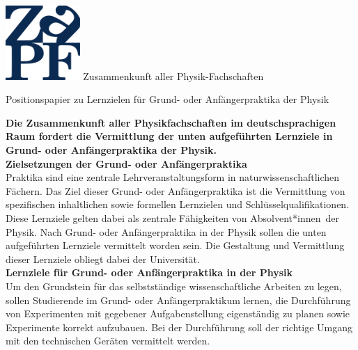 \documentclass[DIV=calc]{scrartcl}
\newcommand{\gen}{*innen}
\begin{document}
    \hspace{0.87\textwidth}
    \begin{minipage}{120pt}
        \vspace{-1.8cm}
        \includegraphics[width=80pt]{logo.pdf}
        \centering
        \small Zusammenkunft aller Physik-Fachschaften
    \end{minipage}
    \begin{center}
        \huge{Positionspapier zu Lernzielen für Grund- oder Anfängerpraktika der Physik} \\
        \normalsize
    \end{center}
    
    \vspace{1cm}    
\textbf{Die Zusammenkunft aller Physikfachschaften im deutschsprachigen Raum fordert die Vermittlung der unten aufgeführten Lernziele in Grund- oder Anfängerpraktika der Physik.}\\

\textbf{Zielsetzungen der Grund- oder Anfängerpraktika}\\

Praktika sind eine zentrale Lehrveranstaltungsform in naturwissenschaftlichen Fächern. Das Ziel dieser Grund- oder Anfängerpraktika ist die Vermittlung von spezifischen inhaltlichen sowie formellen Lernzielen und Schlüsselqualifikationen.\\
Diese Lernziele gelten dabei als zentrale Fähigkeiten von Absolvent\gen \ der Physik. Nach Grund- oder Anfängerpraktika in der Physik sollen die unten aufgeführten Lernziele vermittelt worden sein. Die Gestaltung und Vermittlung dieser Lernziele obliegt dabei der Universität.\\

\textbf{Lernziele für Grund- oder Anfängerpraktika in der Physik}\\

Um den Grundstein für das selbstständige wissenschaftliche Arbeiten zu legen, sollen Studierende im Grund- oder Anfängerpraktikum lernen, die Durchführung von Experimenten mit gegebener Aufgabenstellung eigenständig zu planen sowie Experimente korrekt aufzubauen. Bei der Durchführung soll der richtige Umgang mit den technischen Geräten vermittelt werden.\\
\end{document}

